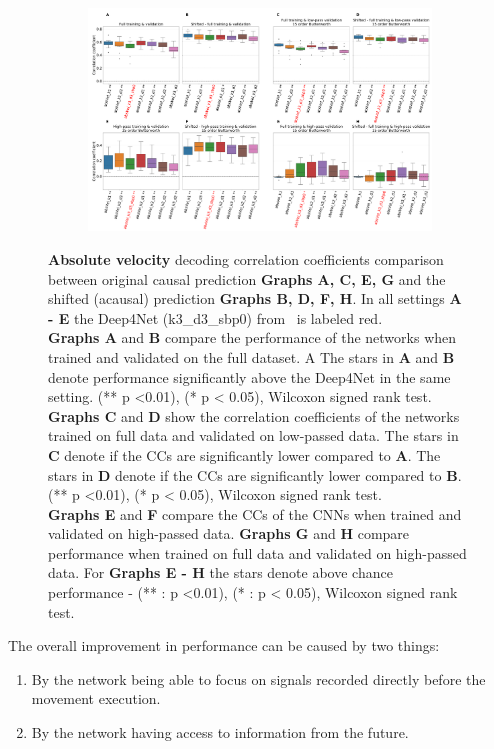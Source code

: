 \begin{figure}[!htbp]\ContinuedFloat
\begin{subfigure}[t]{\textwidth}
   \includegraphics[width=1\linewidth]{img/ch4/original_vs_shifted_absVel_performance_comparison.pdf}
   \caption{}
   \label{fig:shifted-performance-absVel}
\end{subfigure}
\caption[Absolute velocity: non-shifted vs. shifted setting performances]{{\textbf{Absolute velocity} decoding correlation coefficients comparison between original causal prediction \textbf{Graphs A, C, E, G} and the shifted (acausal) prediction \textbf{Graphs B, D, F, H}. In all settings \textbf{
   A - E} the Deep4Net (k3\_d3\_sbp0) from~\cite{Hammer-2021} is labeled red.\\ \textbf{Graphs A} and \textbf{B} compare the performance of the networks when trained and validated on the full dataset. A The stars in \textbf{A} and \textbf{B} denote performance significantly above the Deep4Net in the same setting. (** p <0.01), (* p < 0.05), Wilcoxon signed rank test.
   \\\textbf{Graphs C} and \textbf{D} show the correlation coefficients of the networks trained on full data and validated on low-passed data. 
   The stars in \textbf{C} denote if the CCs are significantly lower compared to \textbf{A}. The stars in \textbf{D} denote if the CCs are significantly lower compared to \textbf{B}. (** p <0.01), (* p < 0.05), Wilcoxon signed rank test.
   \\\textbf{Graphs E} and \textbf{F} compare the CCs of the CNNs when trained and validated on high-passed data. \textbf{Graphs G} and \textbf{H} compare performance when trained on full data and validated on high-passed data. For \textbf{Graphs E - H} the stars denote above chance performance - (** : p <0.01), (* : p < 0.05), Wilcoxon signed rank test.}}
   \label{fig:shifted-performance}
\end{figure}
\clearpage
The overall improvement in performance can be caused by two things:
\begin{enumerate}
    \item By the network being able to focus on signals recorded directly before the movement execution.
    \item By the network having access to information from the future.
\end{enumerate}

